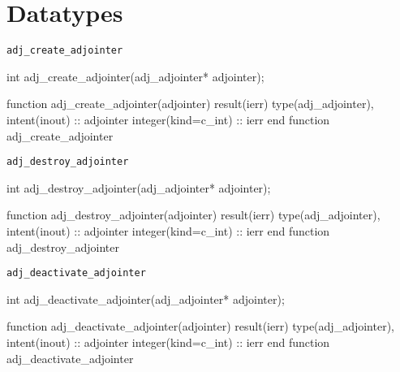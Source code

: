 \chapter{Datatypes}
\begin{synopsis}
\end{synopsis}
\minitoc
\vspace{\fill}
\newpage

\begin{boxwithtitle}{\texttt{adj_create_adjointer}}
\begin{minipage}{\columnwidth}
\begin{ccode}
  int adj_create_adjointer(adj_adjointer* adjointer);
\end{ccode}
\begin{fortrancode}
  function adj_create_adjointer(adjointer) result(ierr) 
    type(adj_adjointer), intent(inout) :: adjointer
    integer(kind=c_int) :: ierr
  end function adj_create_adjointer
\end{fortrancode}
\end{minipage}
\end{boxwithtitle}


\begin{boxwithtitle}{\texttt{adj_destroy_adjointer}}
\begin{minipage}{\columnwidth}
\begin{ccode}
  int adj_destroy_adjointer(adj_adjointer* adjointer);
\end{ccode}
\begin{fortrancode}
  function adj_destroy_adjointer(adjointer) result(ierr) 
    type(adj_adjointer), intent(inout) :: adjointer
    integer(kind=c_int) :: ierr
  end function adj_destroy_adjointer
\end{fortrancode}
\end{minipage}
\end{boxwithtitle}


\begin{boxwithtitle}{\texttt{adj_deactivate_adjointer}}
\begin{minipage}{\columnwidth}
\begin{ccode}
  int adj_deactivate_adjointer(adj_adjointer* adjointer);
\end{ccode}
\begin{fortrancode}
  function adj_deactivate_adjointer(adjointer) result(ierr) 
    type(adj_adjointer), intent(inout) :: adjointer
    integer(kind=c_int) :: ierr
  end function adj_deactivate_adjointer
\end{fortrancode}
\end{minipage}
\end{boxwithtitle}



